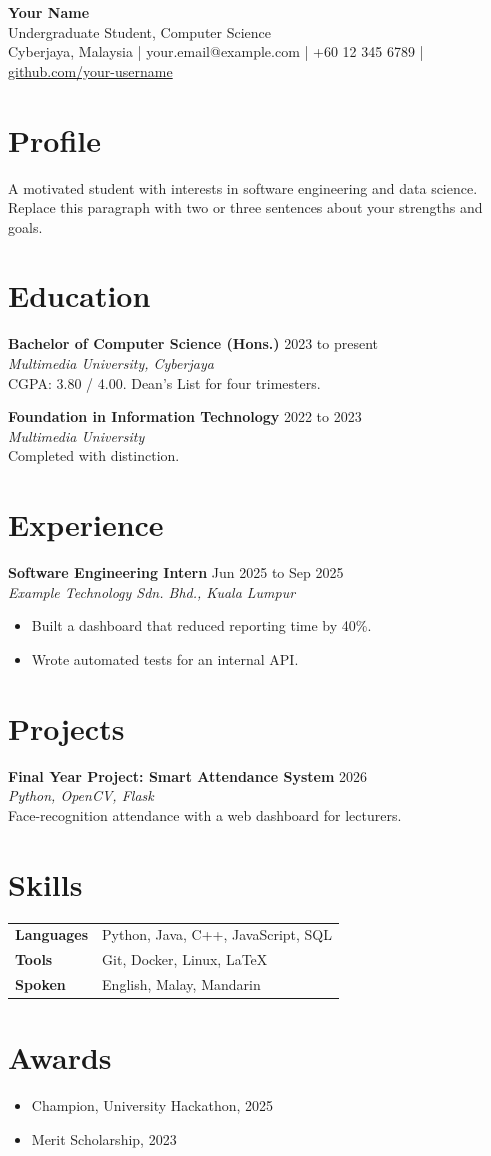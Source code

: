 \documentclass[10pt,a4paper]{article}
\newcommand{\entry}[4]{%
  \textbf{#1} \hfill {\color{gray}#2}\\
  \textit{#3}\\[-0.2em]
  #4\par\medskip}
\begin{document}
{\Huge\bfseries Your Name}\\[0.4em]
{\large\color{accent} Undergraduate Student, Computer Science}\\[0.6em]
\small
Cyberjaya, Malaysia \quad | \quad your.email@example.com \quad | \quad +60 12 345 6789 \quad | \quad \href{https://github.com/your-username}{github.com/your-username}
\normalsize

\section{Profile}
A motivated student with interests in software engineering and data science. Replace this paragraph with two or three sentences about your strengths and goals.

\section{Education}
\entry{Bachelor of Computer Science (Hons.)}{2023 to present}{Multimedia University, Cyberjaya}{CGPA: 3.80 / 4.00. Dean's List for four trimesters.}

\entry{Foundation in Information Technology}{2022 to 2023}{Multimedia University}{Completed with distinction.}

\section{Experience}
\entry{Software Engineering Intern}{Jun 2025 to Sep 2025}{Example Technology Sdn. Bhd., Kuala Lumpur}{%
\begin{itemize}
  \item Built a dashboard that reduced reporting time by 40\%.
  \item Wrote automated tests for an internal API.
\end{itemize}}

\section{Projects}
\entry{Final Year Project: Smart Attendance System}{2026}{Python, OpenCV, Flask}{Face-recognition attendance with a web dashboard for lecturers.}

\section{Skills}
\begin{tabularx}{\textwidth}{@{}lX@{}}
  \textbf{Languages} & Python, Java, C++, JavaScript, SQL \\
  \textbf{Tools} & Git, Docker, Linux, \LaTeX \\
  \textbf{Spoken} & English, Malay, Mandarin \\
\end{tabularx}

\section{Awards}
\begin{itemize}
  \item Champion, University Hackathon, 2025
  \item Merit Scholarship, 2023
\end{itemize}
\end{document}
